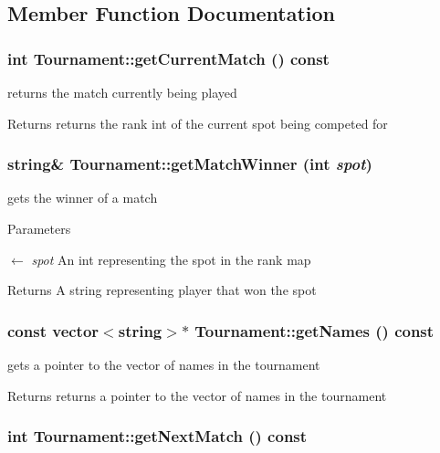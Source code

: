 \subsection{Member Function Documentation}
\hypertarget{classTournament_ac33ed6461f737d97b0f00eb4f8ee5e10}{
\subsubsection[{getCurrentMatch}]{\setlength{\rightskip}{0pt plus 5cm}int Tournament::getCurrentMatch () const}}
\label{classTournament_ac33ed6461f737d97b0f00eb4f8ee5e10}


returns the match currently being played \begin{DoxyReturn}{Returns}
returns the rank int of the current spot being competed for 
\end{DoxyReturn}
\hypertarget{classTournament_a901b93c3122918e646a3c8f5625b4681}{
\subsubsection[{getMatchWinner}]{\setlength{\rightskip}{0pt plus 5cm}string\& Tournament::getMatchWinner (int {\em spot})}}
\label{classTournament_a901b93c3122918e646a3c8f5625b4681}


gets the winner of a match 
\begin{DoxyParams}{Parameters}
\item[\mbox{$\leftarrow$} {\em spot}]An int representing the spot in the rank map \end{DoxyParams}
\begin{DoxyReturn}{Returns}
A string representing player that won the spot 
\end{DoxyReturn}
\hypertarget{classTournament_a7afa6db20cf8ae5c4b5991f2fb29e04e}{
\subsubsection[{getNames}]{\setlength{\rightskip}{0pt plus 5cm}const vector$<$string$>$$\ast$ Tournament::getNames () const}}
\label{classTournament_a7afa6db20cf8ae5c4b5991f2fb29e04e}


gets a pointer to the vector of names in the tournament \begin{DoxyReturn}{Returns}
returns a pointer to the vector of names in the tournament 
\end{DoxyReturn}
\hypertarget{classTournament_a3297fe5ad9a08392d8122bacb5bcf840}{
\subsubsection[{getNextMatch}]{\setlength{\rightskip}{0pt plus 5cm}int Tournament::getNextMatch () const}}
\label{classTournament_a3297fe5ad9a08392d8122bacb5bcf840}


